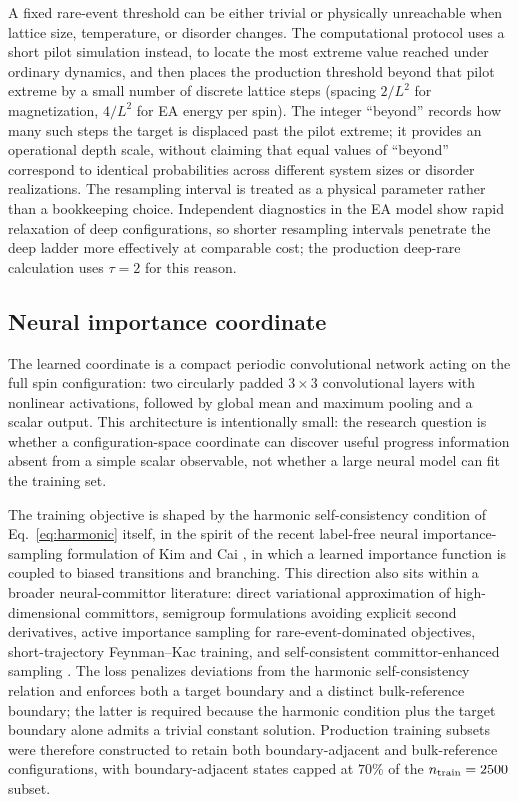 \documentclass[a4paper,fleqn]{cas-sc}
\begin{document}
A fixed rare-event threshold can be either trivial or physically unreachable when lattice
size, temperature, or disorder changes. The computational protocol uses a short pilot
simulation instead, to locate the most extreme value reached under ordinary dynamics, and then
places the production threshold beyond that pilot extreme by a small number of discrete
lattice steps (spacing $2/L^2$ for magnetization, $4/L^2$ for EA energy per spin). The integer
``beyond'' records how many such steps the target is displaced past the pilot extreme; it
provides an operational depth scale, without claiming that equal values of ``beyond''
correspond to identical probabilities across different system sizes or disorder realizations.
The resampling interval is treated as a physical parameter rather than a bookkeeping choice.
Independent diagnostics in the EA model show rapid relaxation of deep configurations, so
shorter resampling intervals penetrate the deep ladder more effectively at comparable cost;
the production deep-rare calculation uses $\tau=2$ for this reason.

\subsection{Neural importance coordinate}\label{sec:neural}
The learned coordinate is a compact periodic convolutional network acting on the full spin
configuration: two circularly padded $3\times3$ convolutional layers with nonlinear
activations, followed by global mean and maximum pooling and a scalar output. This
architecture is intentionally small: the research question is whether a configuration-space
coordinate can discover useful progress information absent from a simple scalar observable,
not whether a large neural model can fit the training set.

The training objective is shaped by the harmonic self-consistency condition of
Eq.~\eqref{eq:harmonic} itself, in the spirit of the recent label-free neural
importance-sampling formulation of Kim and Cai \citep{kimcai2026}, in which a learned
importance function is coupled to biased transitions and branching. This direction also sits
within a broader neural-committor literature: direct variational approximation of
high-dimensional committors, semigroup formulations avoiding explicit second derivatives,
active importance sampling for rare-event-dominated objectives, short-trajectory
Feynman--Kac training, and self-consistent committor-enhanced sampling
\citep{khoo2019,li2022,rotskoff2022,strahan2023,kang2024,trizio2025}. The loss penalizes
deviations from the harmonic self-consistency relation and enforces both a target boundary and
a distinct bulk-reference boundary; the latter is required because the harmonic condition plus
the target boundary alone admits a trivial constant solution. Production training subsets were
therefore constructed to retain both boundary-adjacent and bulk-reference configurations, with
boundary-adjacent states capped at $70\%$ of the $n_{\rm train}=2500$ subset.
\end{document}
